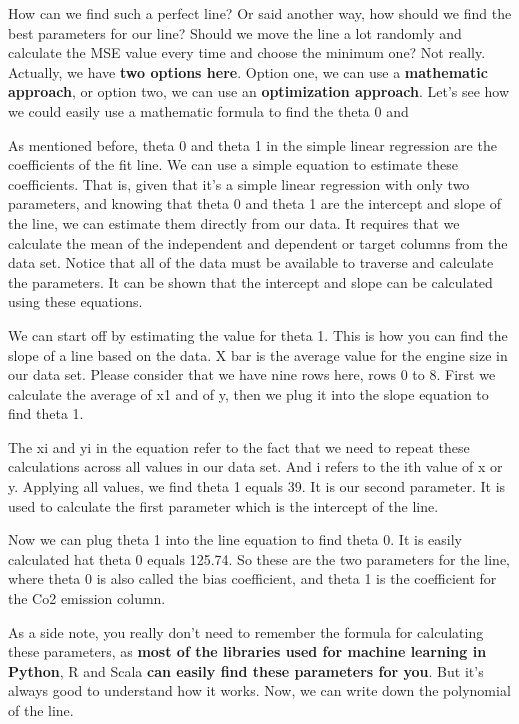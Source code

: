 	How can we find such a perfect line? Or said another way, how should we find the best parameters for our line? Should we move the line a lot randomly and calculate the MSE value every time and choose the minimum one? Not really. Actually, we have \textbf{two options here}. Option one, we can use a \textbf{mathematic approach}, or option two, we can use an \textbf{optimization approach}. Let's see how we could easily use a mathematic formula to find the theta 0 and
	
	As mentioned before, theta 0 and theta 1 in the simple linear regression are the coefficients of the fit line. We can use a simple equation to estimate these coefficients. That is, given that it's a simple linear regression with only two parameters, and knowing that theta 0 and theta 1 are the intercept and slope of the line, we can estimate them directly from our data. It requires that we calculate the mean of the independent and dependent or target columns from the data set. Notice that all of the data must be available to traverse and calculate the parameters. It can be shown that the intercept and slope can be calculated using these equations.
	
	We can start off by estimating the value for theta 1. This is how you can find the slope of a line based on the data. X bar is the average value for the engine size in our data set. Please consider that we have nine rows here, rows 0 to 8. First we calculate the average of x1 and of y, then we plug it into the slope equation to find theta 1.
	
	The xi and yi in the equation refer to the fact that we need to repeat these calculations across all values in our data set. And i refers to the ith value of x or y. Applying all values, we find theta 1 equals 39. It is our second parameter. It is used to calculate the first parameter which is the intercept of the line.
	
	Now we can plug theta 1 into the line equation to find theta 0. It is easily calculated hat theta 0 equals 125.74. So these are the two parameters for the line, where theta 0 is also called the bias coefficient, and theta 1 is the coefficient for the Co2 emission column.
	
	As a side note, you really don't need to remember the formula for calculating these parameters, as \textbf{most of the libraries used for machine learning in Python}, R and Scala \textbf{can easily find these parameters for you}. But it's always good to understand how it works. Now, we can write down the polynomial of the line.
	
